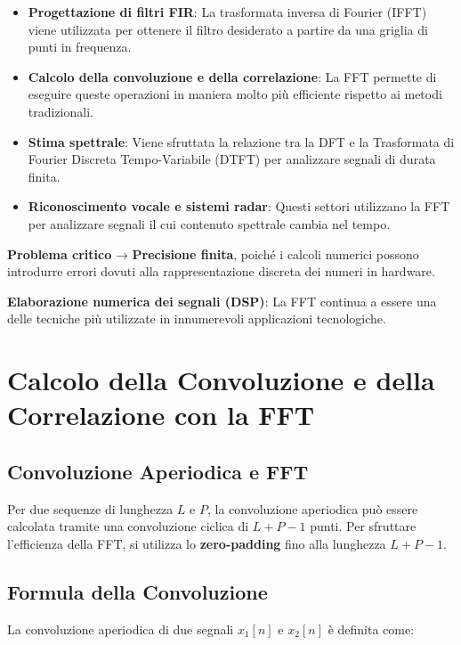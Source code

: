 \begin{itemize}
    \item \textbf{Progettazione di filtri FIR}: La trasformata inversa di Fourier (IFFT) viene utilizzata per ottenere il filtro desiderato a partire da una griglia di punti in frequenza.
    \item \textbf{Calcolo della convoluzione e della correlazione}: La FFT permette di eseguire queste operazioni in maniera molto più efficiente rispetto ai metodi tradizionali.
    \item \textbf{Stima spettrale}: Viene sfruttata la relazione tra la DFT e la Trasformata di Fourier Discreta Tempo-Variabile (DTFT) per analizzare segnali di durata finita.
    \item \textbf{Riconoscimento vocale e sistemi radar}: Questi settori utilizzano la FFT per analizzare segnali il cui contenuto spettrale cambia nel tempo.
\end{itemize}

\textbf{Problema critico} → \textbf{Precisione finita}, poiché i calcoli numerici possono introdurre errori dovuti alla rappresentazione discreta dei numeri in hardware.

\textbf{Elaborazione numerica dei segnali (DSP)}: La FFT continua a essere una delle tecniche più utilizzate in innumerevoli applicazioni tecnologiche.

\section*{Calcolo della Convoluzione e della Correlazione con la FFT}

\subsection*{Convoluzione Aperiodica e FFT}

Per due sequenze di lunghezza \( L \) e \( P \), la convoluzione aperiodica può essere calcolata tramite una convoluzione ciclica di \( L+P-1 \) punti. Per sfruttare l'efficienza della FFT, si utilizza lo \textbf{zero-padding} fino alla lunghezza \( L+P-1 \).

\subsection*{Formula della Convoluzione}

La convoluzione aperiodica di due segnali \( x_1[n] \) e \( x_2[n] \) è definita come:

